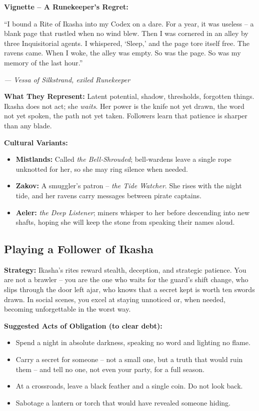 \documentclass[10pt,a5paper]{book}
\begin{document}
\textbf{Vignette – A Runekeeper’s Regret:}
\epigraph{“I bound a Rite of Ikasha into my Codex on a dare. For a year, it was useless – a blank page that rustled when no wind blew. Then I was cornered in an alley by three Inquisitorial agents. I whispered, ‘Sleep,’ and the page tore itself free. The ravens came. When I woke, the alley was empty. So was the page. So was my memory of the last hour.”}{\textit{— Vessa of Silkstrand, exiled Runekeeper}}

\textbf{What They Represent:} Latent potential, shadow, thresholds, forgotten things. Ikasha does not act; she \textit{waits}. Her power is the knife not yet drawn, the word not yet spoken, the path not yet taken. Followers learn that patience is sharper than any blade.

\textbf{Cultural Variants:}
\begin{itemize}
    \item \textbf{Mistlands:} Called \textit{the Bell‑Shrouded}; bell‑wardens leave a single rope unknotted for her, so she may ring silence when needed.
    \item \textbf{Zakov:} A smuggler’s patron – \textit{the Tide Watcher}. She rises with the night tide, and her ravens carry messages between pirate captains.
    \item \textbf{Aeler:} \textit{the Deep Listener}; miners whisper to her before descending into new shafts, hoping she will keep the stone from speaking their names aloud.
\end{itemize}

\subsection*{Playing a Follower of Ikasha}

\textbf{Strategy:} Ikasha’s rites reward stealth, deception, and strategic patience. You are not a brawler – you are the one who waits for the guard’s shift change, who slips through the door left ajar, who knows that a secret kept is worth ten swords drawn. In social scenes, you excel at staying unnoticed or, when needed, becoming unforgettable in the worst way.

\textbf{Suggested Acts of Obligation (to clear debt):}
\begin{itemize}
    \item Spend a night in absolute darkness, speaking no word and lighting no flame.
    \item Carry a secret for someone – not a small one, but a truth that would ruin them – and tell no one, not even your party, for a full season.
    \item At a crossroads, leave a black feather and a single coin. Do not look back.
    \item Sabotage a lantern or torch that would have revealed someone hiding.
\end{itemize}
\end{document}
